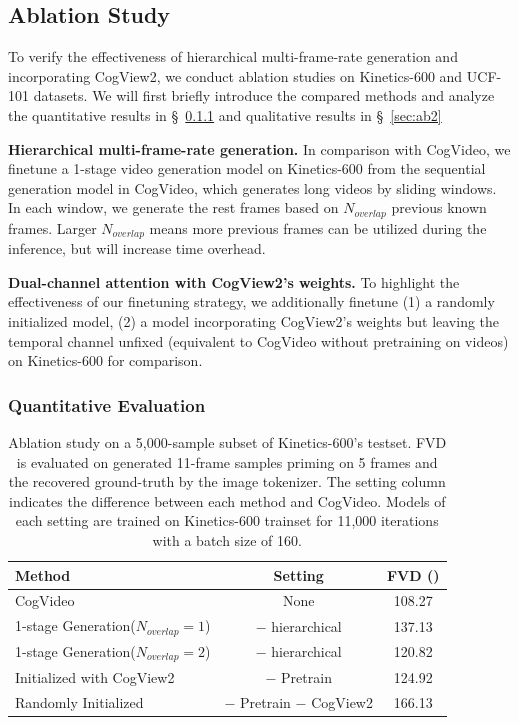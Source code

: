 \subsection{Ablation Study} \label{subsec:ablation study}
To verify the effectiveness of hierarchical multi-frame-rate generation and incorporating CogView2, we conduct ablation studies on Kinetics-600 and UCF-101 datasets. We will first briefly introduce the compared methods and analyze the quantitative results in \S~\ref{sec:ab1} and qualitative results in \S~\ref{sec:ab2}

\textbf{Hierarchical multi-frame-rate generation.} In comparison with CogVideo, we finetune a 1-stage video generation model on Kinetics-600 from the sequential generation model in CogVideo, which generates long videos by sliding windows. In each window, we generate the rest frames based on $N_{overlap}$ previous known frames. Larger $N_{overlap}$ means more previous frames can be utilized during the inference, but will increase time overhead. 

\textbf{Dual-channel attention with CogView2's weights.} To highlight the effectiveness of our finetuning strategy, we additionally finetune (1) a randomly initialized model, (2) a model incorporating CogView2's weights but leaving the temporal channel unfixed (equivalent to CogVideo without pretraining on videos) on Kinetics-600 for comparison.

\subsubsection{Quantitative Evaluation}\label{sec:ab1}
\begin{table}
  \caption{Ablation study on a 5,000-sample subset of Kinetics-600's testset. FVD is evaluated on generated 11-frame samples priming on 5 frames and the recovered ground-truth by the image tokenizer. The setting column indicates the difference between each method and CogVideo. Models of each setting are trained on Kinetics-600 trainset for 11,000 iterations with a batch size of 160. }
  \label{tab:ablation-study}
  \centering
  \begin{tabular}{lcc}
    \toprule
    Method & Setting & FVD ()              \\
    \midrule
    CogVideo & None & 108.27\\
    \midrule
    1-stage Generation($N_{overlap}=1$) & $-$ hierarchical & 137.13\\
    1-stage Generation($N_{overlap}=2$) & $-$ hierarchical & 120.82\\
    \midrule
    Initialized with CogView2 & $-$ Pretrain & 124.92 \\
    Randomly Initialized & $-$ Pretrain $-$ CogView2 & 166.13 \\
    
    \bottomrule
  \end{tabular}
\end{table}

